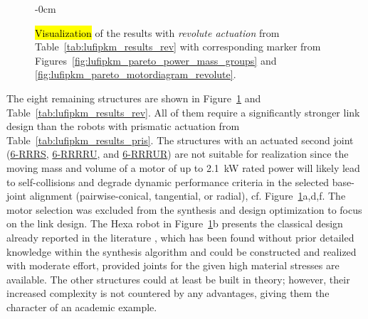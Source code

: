 \begin{figure}[H]
  \begin{adjustwidth}{-\extralength}{0cm}
    \centering
    \graphicspath{{Figures/}}
    
  \end{adjustwidth}
  \caption{\hl{Visualization} %
    of the results with \emph{revolute actuation} from Table~\ref{tab:lufipkm_results_rev} with corresponding marker from Figures~\ref{fig:lufipkm_pareto_power_mass_groups} and \ref{fig:lufipkm_pareto_motordiagram_revolute}.}
  \label{fig:lufipkm_robots4}
\end{figure}

The eight remaining structures are shown in Figure~\ref{fig:lufipkm_robots4} and Table~\ref{tab:lufipkm_results_rev}.
All of them require a significantly stronger link design than the robots with prismatic actuation from \mbox{Table~\ref{tab:lufipkm_results_pris}}.
The structures with an actuated second joint (\hyperref[restabrow:P6RRRRRR10V3GxPxA2]{6-{R}\underline{R}{R}{S}}, \hyperref[restabrow:P6RRRRRR5V3GxPxA2]{6-{R}\underline{R}{R}{R}{U}}, and \hyperref[restabrow:P6RRRRRR6V3GxPxA2]{6-{R}\underline{R}{R}{U}{R}}) are not suitable for realization since the moving mass and volume of a motor of up to \SI{2.1}{\kilo\watt} rated power will likely lead to self-collisions and degrade dynamic performance criteria in the selected base-joint alignment (pairwise-conical, tangential, or radial), cf. Figure~\ref{fig:lufipkm_robots4}a,d,f.
The motor selection was excluded from the synthesis and design optimization to focus on the link design.
The Hexa robot in Figure~\ref{fig:lufipkm_robots4}b presents the classical design already reported in the literature \cite{Frindt2001}, which has been found without prior detailed knowledge within the synthesis algorithm and could be constructed and realized with moderate effort, provided joints for the given high material stresses are available.
The other structures could at least be built in theory; however, their increased complexity is not countered by any advantages, giving them the character of an academic example.

